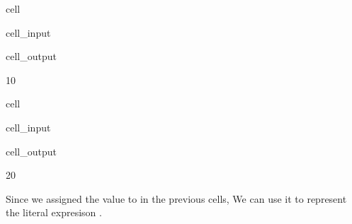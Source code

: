 \documentclass[letterpaper,10pt,english]{jupyterBook}
\begin{document}
\begin{sphinxuseclass}{cell}\begin{sphinxVerbatimInput}

\begin{sphinxuseclass}{cell_input}
\begin{sphinxVerbatim}[commandchars=\\\{\}]
\end{sphinxVerbatim}

\end{sphinxuseclass}\end{sphinxVerbatimInput}
\begin{sphinxVerbatimOutput}

\begin{sphinxuseclass}{cell_output}
\begin{sphinxVerbatim}[commandchars=\\\{\}]
10
\end{sphinxVerbatim}

\end{sphinxuseclass}\end{sphinxVerbatimOutput}

\end{sphinxuseclass}
\begin{sphinxuseclass}{cell}\begin{sphinxVerbatimInput}

\begin{sphinxuseclass}{cell_input}
\begin{sphinxVerbatim}[commandchars=\\\{\}]
  
\end{sphinxVerbatim}

\end{sphinxuseclass}\end{sphinxVerbatimInput}
\begin{sphinxVerbatimOutput}

\begin{sphinxuseclass}{cell_output}
\begin{sphinxVerbatim}[commandchars=\\\{\}]
20
\end{sphinxVerbatim}

\end{sphinxuseclass}\end{sphinxVerbatimOutput}

\end{sphinxuseclass}
\sphinxAtStartPar
Since we assigned the value  to  in the previous cells, We can use it to represent the literal expresison .
\end{document}
